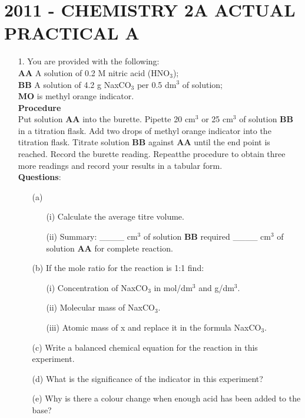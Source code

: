 \section{2011 - CHEMISTRY 2A ACTUAL PRACTICAL A}

\begin{enumerate}
\item[1.] You are provided with the following:\\
\textbf{AA}  A solution of 0.2 M nitric acid (HNO$_3$);\\
\textbf{BB}  A solution of 4.2 g NaxCO$_3$ per 0.5 dm$^3$ of solution;\\
\textbf{MO} is methyl orange indicator.\\[10pt]

\textbf{Procedure}\\

Put solution \textbf{AA} into the burette. Pipette 20 cm$^3$ or 25 cm$^3$ of solution \textbf{BB} in a titration flask. Add two drops of methyl orange indicator into the titration flask. Titrate solution \textbf{BB} against \textbf{AA} until the end point is reached. Record the burette reading. Repeatthe procedure to obtain three more readings and record your results in a tabular form.\\[10pt]

\textbf{Questions}:\\
\begin{enumerate}
\item[(a)] 
\begin{enumerate}
\item[(i)] Calculate the average titre volume.
\item[(ii)] Summary:  \_\_\_\_ cm$^3$ of solution \textbf{BB} required \_\_\_\_ cm$^3$ of solution \textbf{AA} for complete reaction.
\end{enumerate}

\item[(b)] If the mole ratio for the reaction is 1:1 find:\\
\begin{enumerate}
\item[(i)] Concentration of NaxCO$_3$ in mol/dm$^3$ and g/dm$^3$.
\item[(ii)] Molecular mass of NaxCO$_3$.
\item[(iii)] Atomic mass of x and replace it in the formula NaxCO$_3$.
\end{enumerate}

\item[(c)] Write a balanced chemical equation for the reaction in this experiment.
\item[(d)] What is the significance of the indicator in this experiment?
\item[(e)] Why is there a colour change when enough acid has been added to the base?


\end{enumerate}
\end{enumerate}
